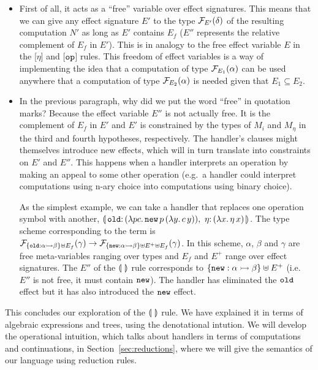 \begin{itemize}
\item First of all, it acts as a ``free'' variable over effect
  signatures. This means that we can give any effect signature $E'$ to the
  type $\mathcal{F}_{E'}(\delta)$ of the resulting computation $N'$ as long as $E'$
  contains $E_f$ ($E''$ represents the relative complement of $E_f$ in
  $E'$). This is in analogy to the free effect variable $E$ in the [$\eta$]
  and [$\mathtt{op}$] rules. This freedom of effect variables is a way of
  implementing the idea that a computation of type $\mathcal{F}_{E_1}(\alpha)$ can
  be used anywhere that a computation of type $\mathcal{F}_{E_2}(\alpha)$ is needed
  given that $E_1 \subseteq E_2$.

\item In the previous paragraph, why did we put the word ``free'' in
  quotation marks?  Because the effect variable $E''$ is not actually
  free. It is the complement of $E_f$ in $E'$ and $E'$ is constrained by
  the types of $M_i$ and $M_\eta$ in the third and fourth hypotheses,
  respectively. The handler's clauses might themselves introduce new
  effects, which will in turn translate into constraints on $E'$ and
  $E''$. This happens when a handler interprets an operation by making an
  appeal to some other operation (e.g.\ a handler could interpret
  computations using n-ary choice into computations using binary choice).

  As the simplest example, we can take a handler that replaces one
  operation symbol with another,
  $\banana{\onto{\op{old}}{(\lam{p c}{\app{\op{new}}{p}{(\lam{y}{\ap{c}{y}})}})},\
    {\onto{\eta}}{(\lam{x}{\etaE{x}})}}$. The type scheme corresponding to
  the term is \\
  $\mathcal{F}_{\{\mathtt{old} : \alpha \rightarrowtail \beta\} \uplus E_f}(\gamma) \to
  \mathcal{F}_{\{\mathtt{new} : \alpha \rightarrowtail \beta\} \uplus E^+ \uplus E_f}(\gamma)$. In
  this scheme, $\alpha$, $\beta$ and $\gamma$ are free meta-variables
  ranging over types and $E_f$ and $E^+$ range over effect
  signatures. The $E''$ of the $\llparenthesis \,  \, \rrparenthesis$ rule corresponds to
  $\{\mathtt{new} : \alpha \rightarrowtail \beta\} \uplus E^+$ (i.e. $E''$ is not free, it
  must contain $\mathtt{new}$). The handler has eliminated
  the $\mathtt{old}$ effect but it has also introduced the $\mathtt{new}$ effect.
\end{itemize}

This concludes our exploration of the $\llparenthesis \,  \, \rrparenthesis$ rule. We have explained
it in terms of algebraic expressions and trees, using the denotational
intution. We will develop the operational intuition, which talks about
handlers in terms of computations and continuations, in
Section~\ref{sec:reductions}, where we will give the semantics of our
language using reduction rules.

